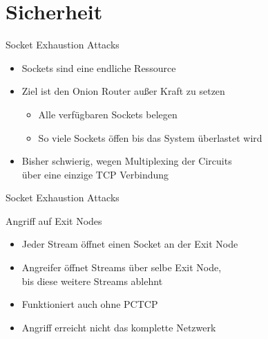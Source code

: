 \documentclass{beamer}
\begin{document}
\section{Sicherheit}


\begin{frame}{Socket Exhaustion Attacks}{\secname}
  \begin{itemize}
    \item Sockets sind eine endliche Ressource
    \item Ziel ist den Onion Router außer Kraft zu setzen
    \begin{itemize}
      \item Alle verfügbaren Sockets belegen
      \item So viele Sockets öffen bis das System überlastet wird
    \end{itemize}
    \item Bisher schwierig, wegen Multiplexing der Circuits\\über eine einzige TCP Verbindung
  \end{itemize}
\end{frame}

 \begin{frame}{Socket Exhaustion Attacks}{\secname}
   \begin{block}{Angriff auf Exit Nodes}
     \begin{itemize}
       \item Jeder Stream öffnet einen Socket an der Exit Node
       \item Angreifer öffnet Streams über selbe Exit Node,\\ bis diese weitere Streams ablehnt
       \item Funktioniert auch ohne PCTCP
       \item Angriff erreicht nicht das komplette Netzwerk
     \end{itemize}
   \end{block}
 \end{frame}
\end{document}
